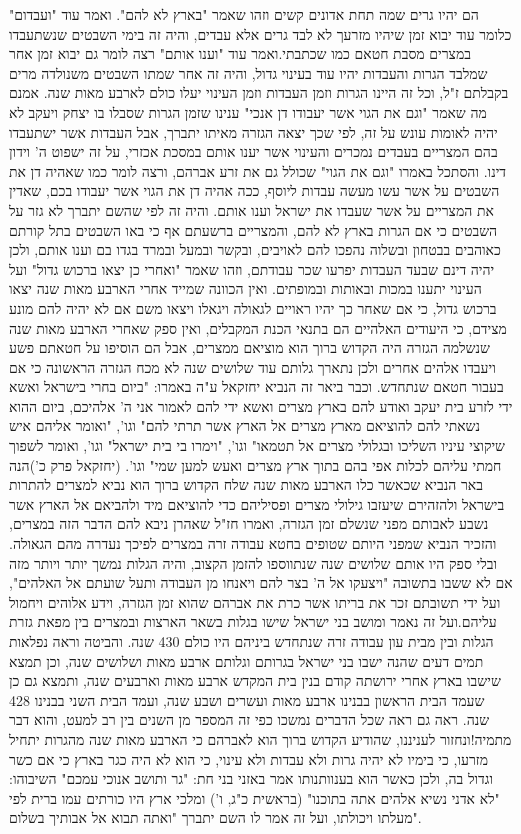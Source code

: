 \documentclass[12pt, openany]{book}
\begin{document}
הם יהיו גרים שמה תחת אדונים קשים וזהו שאמר "בארץ לא להם". ואמר עוד "ועבדום" כלומר עוד יבוא זמן שיהיו מזרעך לא לבד גרים אלא עבדים,  והיה זה בימי השבטים שנשתעבדו במצרים מסבת חטאם כמו שכתבתי.ואמר עוד "וענו אותם" רצה לומר גם יבוא זמן אחר שמלבד הגרות והעבדות יהיו עוד בעינוי גדול, והיה זה אחר שמתו השבטים משנולדה מרים בקבלתם ז"ל, וכל זה היינו הגרות וזמן העבדות וזמן העינוי יעלו כולם לארבע מאות שנה. אמנם מה שאמר "וגם את הגוי אשר יעבודו דן אנכי" ענינו שזמן הגרות שסבלו בו יצחק ויעקב לא יהיה לאומות עונש על זה, לפי שכך יצאה הגזרה מאיתו יתברך, אבל העבדות אשר ישתעבדו בהם המצריים בעבדים נמכרים והעינוי אשר יענו אותם במסכת אכזרי, על זה ישפוט ה' וידון דינו. והסתכל באמרו "וגם את הגוי" שכולל גם את זרע אברהם, ורצה לומר כמו שאהיה דן את השבטים על אשר עשו מעשה עבדות ליוסף, ככה אהיה דן את הגוי אשר יעבודו בכם, שאדין את המצריים על אשר שעבדו את ישראל וענו אותם. והיה זה לפי שהשם יתברך לא גזר על השבטים כי אם הגרות בארץ לא להם, והמצריים ברשעתם אף כי באו השבטים בתל קורתם כאוהבים בבטחון ובשלוה נהפכו להם לאויבים, ובקשר ובמעל ובמרד בגדו בם וענו אותם, ולכן יהיה דינם שבעד העבדות יפרעו שכר עבודתם, וזהו שאמר "ואחרי כן יצאו ברכוש גדול" ועל העינוי יתענו במכות ובאותות ובמופתים. ואין הכוונה שמייד אחרי הארבע מאות שנה יצאו ברכוש גדול, כי אם שאחר כך יהיו ראויים לגאולה ויגאלו ויצאו משם אם לא יהיה להם מונע מצידם, כי היעודים האלהיים הם בתנאי הכנת המקבלים, ואין ספק שאחרי הארבע מאות שנה שנשלמה הגזרה היה הקדוש ברוך הוא מוציאם ממצרים, אבל הם הוסיפו על חטאתם פשע ויעבדו אלהים אחרים ולכן נתארך גלותם עוד שלושים שנה לא מכח הגזרה הראשונה כי אם בעבור חטאם שנתחדש. וכבר ביאר זה הנביא יחזקאל ע"ה באמרו: "ביום בחרי בישראל ואשא ידי לזרע בית יעקב ואודע להם בארץ מצרים ואשא ידי להם לאמור אני ה' אלהיכם, ביום ההוא נשאתי להם להוציאם מארץ מצרים אל הארץ אשר תרתי להם" וגו', "ואומר אליהם איש שיקוצי עיניו השליכו ובגלולי מצרים אל תטמאו" וגו', "וימרו בי בית ישראל" וגו', ואומר לשפוך חמתי עליהם לכלות אפי בהם בתוך ארץ מצרים ואעש למען שמי" וגו'. (יחזקאל פרק כ')הנה באר הנביא שכאשר כלו הארבע מאות שנה שלח הקדוש ברוך הוא נביא למצרים להתרות בישראל ולהזהירם שיעזבו גילולי מצרים ופסיליהם כדי להוציאם מיד ולהביאם אל הארץ אשר נשבע לאבותם מפני שנשלם זמן הגזרה, ואמרו חז"ל שאהרן ניבא להם הדבר הזה במצרים, והזכיר הנביא שמפני היותם שטופים בחטא עבודה זרה במצרים לפיכך נעדרה מהם הגאולה. ובלי ספק היו אותם שלושים שנה שנתווספו להזמן הקצוב, והיה הגלות נמשך יותר ויותר מזה אם לא ששבו בתשובה "ויצעקו אל ה' בצר להם ויאנחו מן העבודה ותעל שועתם אל האלהים", ועל ידי תשובתם זכר את בריתו אשר כרת את אברהם שהוא זמן הגזרה, וידע אלוהים ויחמול עליהם.ועל זה נאמר ומושב בני ישראל שישו בגלות בשאר הארצות ובמצרים בין מפאת גזרת הגלות ובין מבית עון עבודה זרה שנתחדש ביניהם היו כולם 430 שנה. והביטה וראה נפלאות תמים דעים שהנה ישבו בני ישראל בגרותם וגלותם ארבע מאות ושלושים שנה, וכן תמצא שישבו בארץ אחרי ירושתה קודם בנין בית המקדש ארבע מאות וארבעים שנה, ותמצא גם כן שעמד הבית הראשון בבנינו ארבע מאות ועשרים ושבע  שנה, ועמד הבית השני בבנינו 428 שנה. ראה גם ראה שכל הדברים נמשכו כפי זה המספר מן השנים בין רב למעט, והוא דבר מתמיה!ונחזור לעניננו, שהודיע הקדוש ברוך הוא לאברהם כי הארבע מאות שנה מהגרות יתחיל מזרעו, כי בימיו לא יהיה גרות ולא עבדות ולא עינוי, כי הוא לא היה כגר בארץ כי אם כשר וגדול בה, ולכן כאשר הוא בענוותנותו אמר באזני בני חת: "גר ותושב אנוכי עמכם" השיבוהו: "לא אדני נשיא אלהים אתה בתוכנו" (בראשית כ"ג, ו') ומלכי ארץ היו כורתים עמו ברית לפי מעלתו ויכולתו, ועל זה אמר לו השם יתברך "ואתה תבוא אל אבותיך בשלום". 
\end{document}
